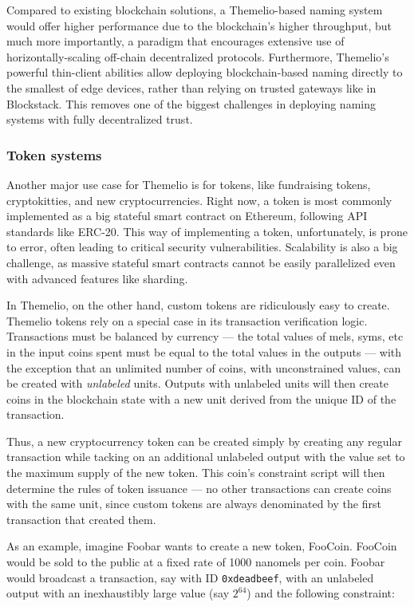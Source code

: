 \documentclass[]{article}
\begin{document}
Compared to existing blockchain solutions, a Themelio-based naming
system would offer higher performance due to the blockchain's higher
throughput, but much more importantly, a paradigm that encourages
extensive use of horizontally-scaling off-chain decentralized protocols.
Furthermore, Themelio's powerful thin-client abilities allow deploying
blockchain-based naming directly to the smallest of edge devices, rather
than relying on trusted gateways like in Blockstack. This removes one of
the biggest challenges in deploying naming systems with fully
decentralized trust.

\hypertarget{token-systems}{%
\subsubsection{Token systems}\label{token-systems}}

Another major use case for Themelio is for tokens, like fundraising
tokens, cryptokitties, and new cryptocurrencies. Right now, a token is
most commonly implemented as a big stateful smart contract on Ethereum,
following API standards like ERC-20. This way of implementing a token,
unfortunately, is prone to error, often leading to critical security
vulnerabilities. Scalability is also a big challenge, as massive
stateful smart contracts cannot be easily parallelized even with
advanced features like sharding.

In Themelio, on the other hand, custom tokens are ridiculously easy to
create. Themelio tokens rely on a special case in its transaction
verification logic. Transactions must be balanced by currency --- the
total values of mels, syms, etc in the input coins spent must be equal
to the total values in the outputs --- with the exception that an
unlimited number of coins, with unconstrained values, can be created
with \emph{unlabeled} units. Outputs with unlabeled units will then
create coins in the blockchain state with a new unit derived from the
unique ID of the transaction.

Thus, a new cryptocurrency token can be created simply by creating any
regular transaction while tacking on an additional unlabeled output with
the value set to the maximum supply of the new token. This coin's
constraint script will then determine the rules of token issuance --- no
other transactions can create coins with the same unit, since custom
tokens are always denominated by the first transaction that created
them.

As an example, imagine Foobar wants to create a new token, FooCoin.
FooCoin would be sold to the public at a fixed rate of 1000 nanomels per
coin. Foobar would broadcast a transaction, say with ID
\texttt{0xdeadbeef}, with an unlabeled output with an inexhaustibly
large value (say \(2^{64}\)) and the following constraint:
\end{document}
